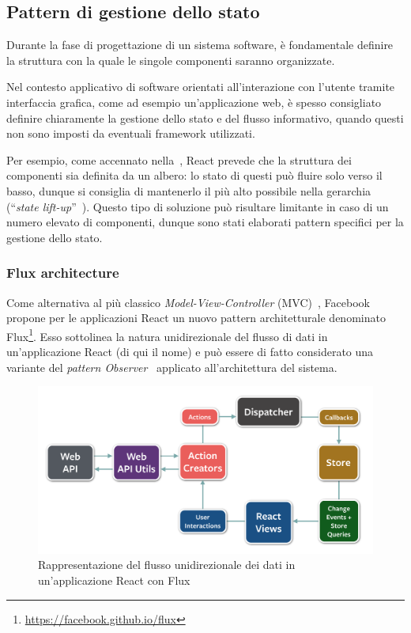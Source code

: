 \subsection{Pattern di gestione dello stato}\label{subsec:state-manage}
Durante la fase di progettazione di un sistema software, è fondamentale definire la struttura con la quale le singole componenti saranno organizzate.

Nel contesto applicativo di software orientati all'interazione con l'utente tramite interfaccia grafica, come ad esempio un'applicazione web,
è spesso consigliato definire chiaramente la gestione dello stato e del flusso informativo, quando questi non sono imposti da eventuali framework utilizzati.

Per esempio, come accennato nella~, React prevede che la struttura dei componenti sia definita da un albero:
lo stato di questi può fluire solo verso il basso, dunque si consiglia di mantenerlo il più alto possibile nella gerarchia (``\emph{state lift-up}''~\cite{react-docs}).
Questo tipo di soluzione può risultare limitante in caso di un numero elevato di componenti, dunque sono stati elaborati pattern specifici per la gestione dello stato.

\subsubsection{Flux architecture}
Come alternativa al più classico \emph{Model-View-Controller} (MVC)~\cite{Reenskaug2003TheM},
Facebook propone per le applicazioni React un nuovo pattern architetturale denominato Flux\footnote{\url{https://facebook.github.io/flux}}. %
Esso sottolinea la natura unidirezionale del flusso di dati in un'applicazione React (di qui il nome)
e può essere di fatto considerato una variante del \emph{pattern Observer}~\cite{10.5555/186897} applicato all'architettura del sistema.

\begin{figure}[htbp]
  \centering
  \includegraphics[width=.9\textwidth]{res/fig/flux-diagram-white-background.png}
  \caption{Rappresentazione del flusso unidirezionale dei dati in un'applicazione React con Flux}%
  \label{fig:flux}
\end{figure}

